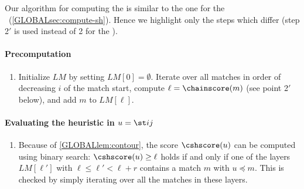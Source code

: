 Our algorithm for computing the \csh is similar to the one for the
\sh~(\cref{GLOBALsec:compute-sh}). Hence we highlight only the steps which
differ (step 2$'$ is used instead of 2 for the \sh).

\paragraph{Precomputation}
\renewcommand\theenumi{\algletter\arabic{enumi}$'$}
\renewcommand\labelenumi{{\rmfamily \algletter\arabic{enumi}$'$.}}
\setlength{\leftmargini}{2.3em}
\begin{samepage}
\newcommand{\algletter}{R}
\begin{enumerate}
  \addtocounter{enumi}{4} %
  \item Initialize $LM$ by setting $LM[0] = \emptyset$. Iterate over all
        matches in order of decreasing $i$ of the match start, compute
        $\ell=\chainscore(m)$ (see point 2$'$ below), and add $m$ to $LM[\ell]$.
\end{enumerate}
\end{samepage}

\paragraph{Evaluating the heuristic in $u = \st ij$}
\begin{samepage}
\newcommand{\algletter}{E}
\begin{enumerate}
  \addtocounter{enumi}{1} %
  \item Because of \cref{GLOBALlem:contour}, the score $\cshscore(u)$
        can be computed using binary search: $\cshscore(u) \geq \ell$ holds if
        and only if one of the layers $LM[\ell']$ with ${\ell\leq \ell'<\ell+r}$
        contains a match $m$ with $u\preceq m$. This is checked by simply iterating over
        all the matches in these layers.
\end{enumerate}
\end{samepage}

